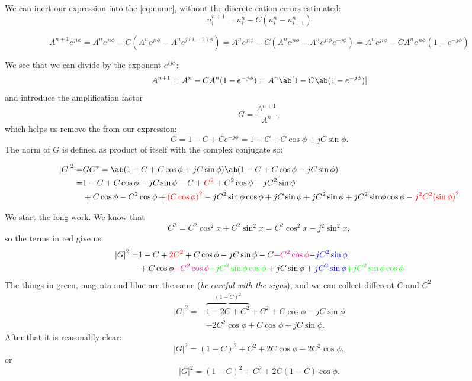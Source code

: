 \documentclass[justified, nobib,a4paper]{tufte-handout}
\begin{document}
We can inert our expression into the \cref{eq:nume}, without the discrete cation errors estimated:
\[
	u^{n+1}_i = u_i^n - C(u_i^n - u_{i-1}^n)
\]
\begin{fullwidth}
	\[
		A^{n+1}e^{ji\phi}
		= A^{n}e^{ji\phi} - C(A^{n}e^{ji\phi} - A^{n}e^{j(i-1)\phi})
		= A^{n}e^{ji\phi} - C(A^{n}e^{ji\phi} - A^{n}e^{ji\phi}e^{-j\phi})
		= A^{n}e^{ji\phi} - CA^{n}e^{ji\phi}(1 - e^{-j\phi})
	\]
\end{fullwidth}
We see that we can divide by the exponent $e^{ij\phi}$:
\[
	A^{n+1}= A^{n} - CA^{n}(1 - e^{-j\phi}) = A^n\ab[ 1 - C\ab( 1 - e^{-j\phi} )]
\]
and introduce the amplification factor
\[
	G = \frac{A^{n+1}}{A^{n}},
\]
which helps us remove the  from our expression:
\[
	G = 1 - C + Ce^{-j\phi} = 1 - C + C\cos\phi + jC\sin\phi.
\]
The norm of $G$ is defined as product of itself with the complex conjugate so:
\begin{fullwidth}
	\[
		\begin{split}
			{|G|}^2 = & G G^* =  \ab(1 - C + C\cos\phi + jC\sin\phi)\ab(1 - C + C\cos\phi - jC\sin\phi)          \\
			=         & 1 - C + C\cos\phi - jC\sin\phi
			- C +{\color{red} C^2} + C^2\cos\phi - jC^2\sin\phi                                                  \\
			          & +          C\cos\phi - C^2\cos\phi + {\color{red}{(C\cos\phi)}^2} - jC^2\sin\phi\cos\phi
			+jC\sin\phi + jC^2\sin\phi + jC^2\sin\phi\cos\phi - {\color{red}j^2 C^2 {(\sin\phi)}^2}
		\end{split}
	\]
\end{fullwidth}
We start the long work. We know that
\[
	C^2 = C^2\cos^2 x + C^2\sin^2 x  = C^2\cos^2 x - j^2 \sin^2 x,
\]
so the terms in {\color{red}red} give us
\[
	\begin{split}
		{|G|}^2
		= & 1 - C +{\color{red} 2C^2} + C\cos\phi - jC\sin\phi
		- C  {\color{magenta}- C^2\cos\phi} {\color{blue}- jC^2\sin\phi  }                             \\
		  & +          C\cos\phi {\color{magenta}- C^2\cos\phi}  {\color{green}- jC^2\sin\phi\cos\phi}
		+jC\sin\phi + {\color{blue}jC^2\sin\phi} {\color{green}+ jC^2\sin\phi\cos\phi}
	\end{split}
\]
The things in {\color{green}green}, {\color{magenta}magenta} and
	{\color{blue}blue} are the same (\emph{be careful with the signs}), and we can
collect different $C$ and $C^2$
\[
	\begin{split}
		{|G|}^2
		= & \overbrace{1 - 2C + C^2}^{{(1 -C)^2}} +C^2 + C\cos\phi - jC\sin\phi
		\\
		  & -2C^2 \cos\phi +          C\cos\phi
		+jC\sin\phi.
	\end{split}
\]
After that it is reasonably clear:
\[
	{|G|}^2 = {(1-C)}^2 + C^2 + 2C\cos\phi  -2C^2 \cos\phi,
\]
or
\[
	{|G|}^2 = {(1-C)}^2 + C^2 + 2C(1-C)\cos\phi.
\]
\end{document}
